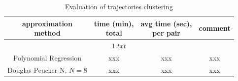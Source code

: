 \begin{table}[!htb]
	\caption{Evaluation of trajectories clustering}
	\label{table:clust_time}
	
	\setlength{\tabcolsep}{10pt}
	\centering
	\setcellgapes{3pt}\makegapedcells
	
	\begin{tabular}{||c|c|c|c||}
		\hline
		\makecell{approximation\\method} & \makecell{time (min),\\total} & \makecell{avg time (sec),\\per pair} & comment \\[0.5ex]
		\hline
		\multicolumn{4}{||c||}{$1.txt$} \\[0.5ex]
		\hline
		Polynomial Regression 	& xxx 	& xxx	& xxx \\[0.5ex]
		\hline
		Douglas-Peucker N, $N = 8$ 	& xxx 	& xxx	& xxx \\[0.5ex]
		
		
		\hline
	\end{tabular}
\end{table}

